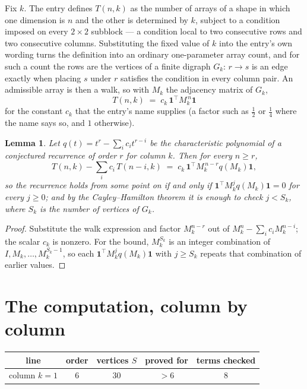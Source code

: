 \documentclass[11pt,a4paper]{article}
\theoremstyle{plain}
\newtheorem{lemma}[theorem]{Lemma}
\theoremstyle{definition}
\begin{document}
Fix $k$. The entry defines $T(n,k)$ as the number of arrays of a shape in which one dimension
is $n$ and the other is determined by $k$, subject to a condition imposed on every
$2\times2$ subblock --- a condition local to two consecutive rows and two consecutive columns.
Substituting the fixed value of $k$ into the entry's own wording turns the definition into an
ordinary one-parameter array count, and for such a count the rows are the vertices of a finite
digraph $G_k$: $r\to s$ is an edge exactly when placing $s$ under $r$ satisfies the condition
in every column pair. An admissible array is then a walk, so with $M_k$ the adjacency matrix
of $G_k$,
\[
T(n,k)\;=\;c_k\,\mathbf{1}^{\!\top}M_k^{\,n}\mathbf{1}
\]
for the constant $c_k$ that the entry's name supplies (a factor such as $\tfrac12$ or
$\tfrac14$ where the name says so, and $1$ otherwise).

\begin{lemma}\label{lem:crit}
Let $q(t)=t^{r}-\sum_i c_it^{r-i}$ be the characteristic polynomial of a conjectured
recurrence of order $r$ for column $k$. Then for every $n\ge r$,
\[
T(n,k)-\sum_i c_i\,T(n-i,k)\;=\;c_k\,\mathbf{1}^{\!\top}M_k^{\,n-r}q(M_k)\mathbf{1},
\]
so the recurrence holds from some point on if and only if
$\mathbf{1}^{\!\top}M_k^{j}q(M_k)\mathbf{1}=0$ for every $j\ge0$; and by the
Cayley--Hamilton theorem it is enough to check $j<S_k$, where $S_k$ is the number of vertices
of $G_k$.
\end{lemma}

\begin{proof}
Substitute the walk expression and factor $M_k^{n-r}$ out of $M_k^{n}-\sum_ic_iM_k^{n-i}$;
the scalar $c_k$ is nonzero. For the bound, $M_k^{S_k}$ is an integer combination of
$I,M_k,\dots,M_k^{S_k-1}$, so each $\mathbf{1}^{\!\top}M_k^{j}q(M_k)\mathbf{1}$ with
$j\ge S_k$ repeats that combination of earlier values.
\end{proof}

\section{The computation, column by column}

\begin{center}
\begin{tabular}{ccccc}
line & order & vertices $S$ & proved for & terms checked \\ \hline
column $k$$=1$ & $6$ & $30$ & $>6$ & $8$ \\
\end{tabular}
\end{center}
\end{document}
